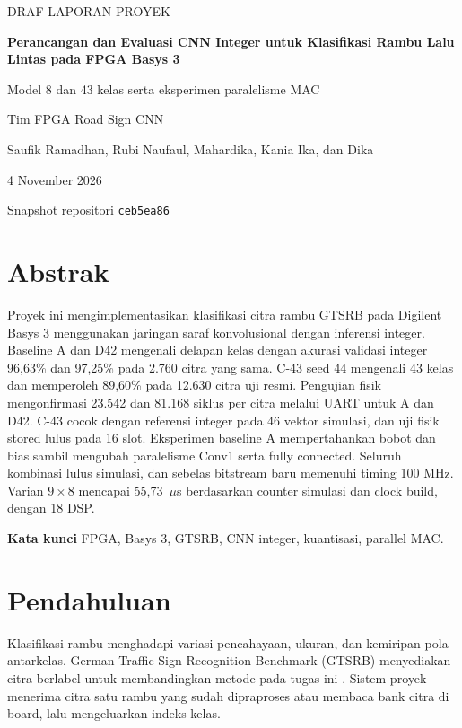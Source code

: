 \documentclass[11pt,a4paper]{article}
\newcommand{\macpair}[2]{\ensuremath{#1\times#2}}
\begin{document}
\raggedbottom
\begin{titlepage}
\centering
\vspace*{28mm}
{\large DRAF LAPORAN PROYEK\par}
\vspace{11mm}
{\huge\bfseries Perancangan dan Evaluasi CNN Integer untuk Klasifikasi Rambu Lalu Lintas pada FPGA Basys 3\par}
\vspace{9mm}
{\large Model 8 dan 43 kelas serta eksperimen paralelisme MAC\par}
\vfill
{\large Tim FPGA Road Sign CNN\par}
\vspace{3mm}
Saufik Ramadhan, Rubi Naufaul, Mahardika, Kania Ika, dan Dika\par
\vspace{12mm}
4 November 2026\par
Snapshot repositori \texttt{ceb5ea86}
\end{titlepage}

\section*{Abstrak}
Proyek ini mengimplementasikan klasifikasi citra rambu GTSRB pada Digilent
Basys 3 menggunakan jaringan saraf konvolusional dengan inferensi integer.
Baseline A dan D42 mengenali delapan kelas dengan akurasi validasi integer
96,63\% dan 97,25\% pada 2.760 citra yang sama. C-43 seed 44 mengenali 43
kelas dan memperoleh 89,60\% pada 12.630 citra uji resmi. Pengujian fisik
mengonfirmasi 23.542 dan 81.168 siklus per citra melalui UART untuk A dan
D42. C-43 cocok dengan referensi integer pada 46 vektor simulasi, dan
uji fisik stored lulus pada 16 slot. Eksperimen baseline A mempertahankan
bobot dan bias sambil mengubah paralelisme Conv1 serta fully connected.
Seluruh kombinasi lulus simulasi, dan sebelas bitstream baru memenuhi
timing 100 MHz. Varian \macpair{9}{8} mencapai 55,73~\(\mu\)s berdasarkan
counter simulasi dan clock build, dengan 18 DSP.

\textbf{Kata kunci} FPGA, Basys 3, GTSRB, CNN integer, kuantisasi, parallel MAC.

\tableofcontents
\listoffigures
\listoftables
\clearpage

\section{Pendahuluan}
Klasifikasi rambu menghadapi variasi pencahayaan, ukuran, dan kemiripan
pola antarkelas. German Traffic Sign Recognition Benchmark (GTSRB)
menyediakan citra berlabel untuk membandingkan metode pada tugas ini
\cite{stallkamp}. Sistem proyek menerima citra satu rambu yang sudah
dipraproses atau membaca bank citra di board, lalu mengeluarkan indeks kelas.
\end{document}
